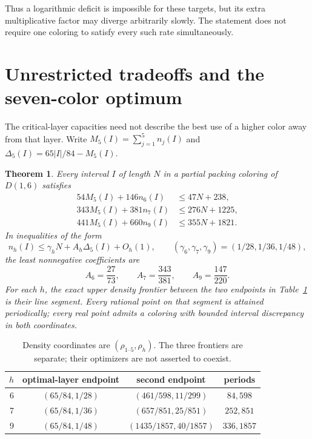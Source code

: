 \documentclass[11pt,reqno]{amsart}
\theoremstyle{plain}
\newtheorem{theorem}{Theorem}
\newcommand{\D}[1]{D(1,#1)}
\theoremstyle{plain}
\theoremstyle{plain}
\begin{document}
Thus a logarithmic deficit is impossible for these targets, but its
extra multiplicative factor may diverge arbitrarily slowly. The statement
does not require one coloring to satisfy every such rate simultaneously.



\section{Unrestricted tradeoffs and the seven-color optimum}\label{M-sec:sharp-high-tangents}

The critical-layer capacities need not describe the best use of a higher
color away from that layer. Write $M_5(I)=\sum_{j=1}^5n_j(I)$ and
$\Delta_5(I)=65|I|/84-M_5(I)$.

\begin{theorem}\label{M-thm:sharp-high-tangents}
Every interval $I$ of length $N$ in a partial packing coloring of $\D{6}$
satisfies
\begin{align*}
54M_5(I)+146n_6(I)&\le47N+238,\\
343M_5(I)+381n_7(I)&\le276N+1225,\\
441M_5(I)+660n_9(I)&\le355N+1821.
\end{align*}
In inequalities of the form
\[
n_h(I)\le\gamma_h N+A_h\Delta_5(I)+O_h(1),
\qquad (\gamma_6,\gamma_7,\gamma_9)=(1/28,1/36,1/48),
\]
the least nonnegative coefficients are
\[
A_6=\frac{27}{73},\qquad A_7=\frac{343}{381},\qquad
A_9=\frac{147}{220}.
\]
For each $h$, the exact upper density frontier between the two endpoints
in Table~\ref{M-tab:sharp-tangent-words} is their line segment. Every rational
point on that segment is attained periodically; every real point admits
a coloring with bounded interval discrepancy in both coordinates.
\end{theorem}

\begin{table}[ht]
\centering\small
\begin{tabular}{rccc}
\toprule
$h$ & optimal-layer endpoint & second endpoint & periods\\
\midrule
6 & $(65/84,1/28)$ & $(461/598,11/299)$ & $84,598$\\
7 & $(65/84,1/36)$ & $(657/851,25/851)$ & $252,851$\\
9 & $(65/84,1/48)$ & $(1435/1857,40/1857)$ & $336,1857$\\
\bottomrule
\end{tabular}
\caption{Density coordinates are $(\rho_{1\text{--}5},\rho_h)$.
The three frontiers are separate; their optimizers are not asserted to coexist.}
\label{M-tab:sharp-tangent-words}
\end{table}
\end{document}
